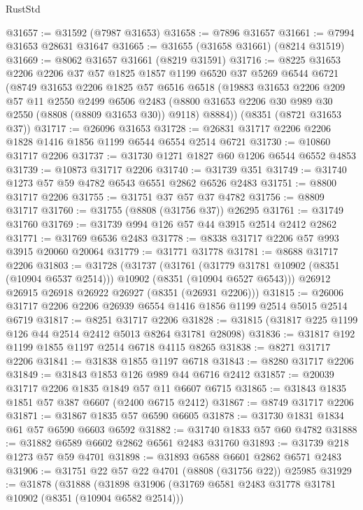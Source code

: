 \begin{lexlean}{RustStd}
\begin{coremodule}
@31657 := @31592 (@7987 @31653)
@31658 := @7896 @31657
@31661 := @7994 @31653 @28631 @31647
@31665 := @31655 (@31658 @31661) (@8214 @31519)
@31669 := @8062 @31657 @31661 (@8219 @31591)
@31716 := @8225
    @31653
    @2206
    @2206
    @37
    @57
    @1825
    @1857
    @1199
    @6520
    @37
    @5269
    @6544
    @6721
    (@8749
      @31653
      @2206
      @1825
      @57
      @6516
      @6518
      (@19883
        @31653
        @2206
        @209
        @57
        @11
        @2550
        @2499
        @6506
        @2483
        (@8800 @31653 @2206 @30 @989 @30 @2550 (@8808 (@8809 @31653 @30)) @9118)
        @8884))
    (@8351 (@8721 @31653 @37))
@31717 := @26096 @31653
@31728 := @26831 @31717 @2206 @2206 @1828 @1416 @1856 @1199 @6544 @6554 @2514 @6721
@31730 := @10860 @31717 @2206
@31737 := @31730 @1271 @1827 @60 @1206 @6544 @6552 @4853
@31739 := @10873 @31717 @2206
@31740 := @31739 @351
@31749 := @31740 @1273 @57 @59 @4782 @6543 @6551 @2862 @6526 @2483
@31751 := @8800 @31717 @2206
@31755 := @31751 @37 @57 @37 @4782
@31756 := @8809 @31717
@31760 := @31755 (@8808 (@31756 @37)) @26295
@31761 := @31749 @31760
@31769 := @31739 @994 @126 @57 @44 @3915 @2514 @2412 @2862
@31771 := @31769 @6536 @2483
@31778 := @8338 @31717 @2206 @57 @993 @3915 @20060 @20064
@31779 := @31771 @31778
@31781 := @8688 @31717 @2206
@31803 := @31728
    (@31737
      (@31761
        (@31779 @31781 @10902 (@8351 (@10904 @6537 @2514)))
        @10902
        (@8351 (@10904 @6527 @6543)))
      @26912
      @26915
      @26918
      @26922
      @26927
      (@8351 (@26931 @2206)))
@31815 := @26006 @31717 @2206 @2206 @26939 @6554 @1416 @1856 @1199 @2514 @5015 @2514 @6719
@31817 := @8251 @31717 @2206
@31828 := @31815 (@31817 @225 @1199 @126 @44 @2514 @2412 @5013 @8264 @31781 @28098)
@31836 := @31817 @192 @1199 @1855 @1197 @2514 @6718 @4115 @8265
@31838 := @8271 @31717 @2206
@31841 := @31838 @1855 @1197 @6718
@31843 := @8280 @31717 @2206
@31849 := @31843 @1853 @126 @989 @44 @6716 @2412
@31857 := @20039 @31717 @2206 @1835 @1849 @57 @11 @6607 @6715
@31865 := @31843 @1835 @1851 @57 @387 @6607 (@2400 @6715 @2412)
@31867 := @8749 @31717 @2206
@31871 := @31867 @1835 @57 @6590 @6605
@31878 := @31730 @1831 @1834 @61 @57 @6590 @6603 @6592
@31882 := @31740 @1833 @57 @60 @4782
@31888 := @31882 @6589 @6602 @2862 @6561 @2483 @31760
@31893 := @31739 @218 @1273 @57 @59 @4701
@31898 := @31893 @6588 @6601 @2862 @6571 @2483
@31906 := @31751 @22 @57 @22 @4701 (@8808 (@31756 @22)) @25985
@31929 := @31878
    (@31888
      (@31898
        @31906
        (@31769 @6581 @2483 @31778 @31781 @10902 (@8351 (@10904 @6582 @2514)))

\end{coremodule}
\end{lexlean}
